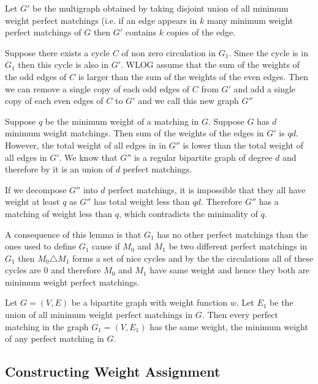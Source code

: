 \begin{alternate-proof}
		Let $G'$ be the multigraph obtained by taking disjoint union of all minimum weight perfect matchings (i.e. if an edge appears in $k$ many minimum weight perfect matchings of $G$ then $G'$ contains  $k$ copies of the edge.
		
		
		Suppose there exists a cycle $C$ of non zero circulation in $G_1$. Since the cycle is in $G_1$ then this cycle is also in $G'$. WLOG  assume that the sum of the weights of the odd edges of $C$ is larger than the sum of the weights of the even edges. Then we can remove a single copy of each odd edges of $C$ from $G'$ and add a single copy of each even edges of $C$ to $G'$ and we call this new graph $G''$
		
		Suppose $q$ be the minimum weight of a matching in $G$. Suppose $G$ has $d$ minimum weight matchings. Then sum of the weights of the edges in $G'$ is $qd$.	However, the total weight of all edges in in $G''$ is lower than the total weight of all edges in $G'$. We know  that $G''$ is a regular bipartite graph of degree $d$ and therefore by  it is an union of $d$ perfect matchings.
		
		If we decompose $G''$ into $d$ perfect matchings, it is impossible that they all have weight at least $q$ as $G''$ has total weight less than $qd$. Therefore $G''$ has a matching of weight less than $q$, which contradicts the minimality of $q$. 
\end{alternate-proof}
A consequence of this lemma is that $G_1$ has no other perfect matchings than the ones used to define $G_1$ cause if $M_0$ and $M_1$ be two different perfect matchings in $G_1$ then $M_0\triangle M_1$ forms a set of nice cycles and by the  the circulations  all of these cycles are 0 and therefore $M_0$ and $M_1$ have same weight and hence they both are minimum weight perfect matchings.
\begin{corolary}{}{}
	Let $G=(V,E)$ be a bipartite graph with weight function $w$. Let $E_1$ be the union of all minimum weight perfect matchings in $G$. Then every perfect matching in the graph $G_1=(V,E_1)$ has the same weight, the minimum weight of any perfect matching in $G$.
\end{corolary}
\subsection{Constructing Weight Assignment}